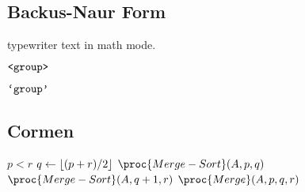 \subsection{Backus-Naur Form}

\begin{description}[\setleftmargin{90pt}\setlabelstyle{\commandstyle}]

\item [textt\{group\}] typewriter text in math mode.

\item [nonterm\{group\}] $\text{{\ttfamily<\ensuremath{\text{{\ttfamily group}}}>}}$

\item [term\{group\}] $\text{{\ttfamily`\ensuremath{\text{{\ttfamily group}}}'}}$

\end{description}

\subsection{Cormen}

\begin{codebox}
\li \If $p < r$ \Then
\li $q \gets \left\lfloor{(p + r) / 2}\right\rfloor$
\li $\proc{Merge-Sort}(A, p, q)$
\li $\proc{Merge-Sort}(A, q + 1, r)$
\li $\proc{Merge}(A, p, q, r)$
\End
\end{codebox}
